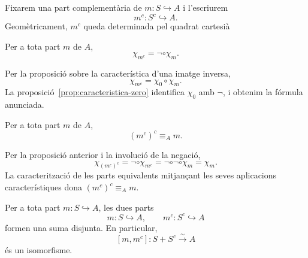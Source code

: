 \begin{notacio}\label{not:complementaria}
Fixarem una part complementària de \(m:S\hookrightarrow A\) i
l'escriurem
\[
m^c:S^c\hookrightarrow A.
\]
Geomètricament, \(m^c\) queda determinada pel quadrat cartesià
\begin{center}
\end{center}
\end{notacio}

\begin{proposicio}\label{prop:caracteristica-complement}
Per a tota part \(m\) de \(A\),
\[
\chi_{m^c}=\neg\circ\chi_m.
\]
\end{proposicio}

\begin{prova}
Per la proposició sobre la característica d'una imatge inversa,
\[
\chi_{m^c}=\chi_0\circ\chi_m.
\]
La proposició~\ref{prop:caracteristica-zero} identifica
\(\chi_0\) amb \(\neg\), i obtenim la fórmula anunciada.
\end{prova}

\begin{proposicio}\label{prop:complementari-involutiu}
Per a tota part \(m\) de \(A\),
\[
{(m^c)}^c\equiv_A m.
\]
\end{proposicio}

\begin{prova}
Per la proposició anterior i la involució de la negació,
\[
\chi_{{(m^c)}^c}
=\neg\circ\chi_{m^c}
=\neg\circ\neg\circ\chi_m
=\chi_m.
\]
La caracterització de les parts equivalents mitjançant les seves
aplicacions característiques dona
\({(m^c)}^c\equiv_A m\).
\end{prova}

\begin{teorema}\label{teo:part-complementari}
Per a tota part \(m:S\hookrightarrow A\), les dues parts
\[
m:S\hookrightarrow A,
\qquad
m^c:S^c\hookrightarrow A
\]
formen una suma disjunta. En particular,
\[
[m,m^c]:S+S^c\xrightarrow{\sim}A
\]
és un isomorfisme.
\end{teorema}

